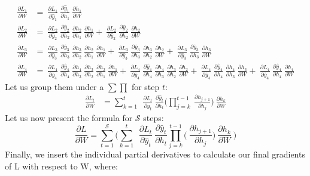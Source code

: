 \documentclass{article}
\begin{document}
\begin{align*}
\frac{\partial L_1}{ \partial{W}} & = ~\frac{\partial L_1}{ \partial \hat{y}_1}~\frac{\partial \hat{y}_1}{ \partial h_1}
  ~\frac{\partial h_1}{ \partial W} \\
	\frac{\partial L_2}{ \partial{W}} & = ~\frac{\partial L_2}{ \partial \hat{y}_2}~\frac{\partial \hat{y}_2}{ \partial h_2}
 ~\frac{\partial h_2}{ \partial h_1} ~\frac{\partial h_1}{ \partial W}	+ ~\frac{\partial L_2}{ \partial \hat{y}_2}~\frac{\partial \hat{y}_2}{ \partial h_2}
  ~\frac{\partial h_2}{ \partial W} \\
 \frac{\partial L_3}{ \partial{W}} & = ~\frac{\partial L_3}{ \partial \hat{y}_3}~\frac{\partial \hat{y}_3}{ \partial h_3}
 ~\frac{\partial h_3}{ \partial h_2} ~\frac{\partial h_2}{ \partial h_1} ~\frac{\partial h_1}{ \partial W}	+ ~\frac{\partial L_3}{ \partial \hat{y}_3}~\frac{\partial \hat{y}_3}{ \partial h_3}
 ~\frac{\partial h_3}{ \partial h_2} ~\frac{\partial h_2}{ \partial W} +  ~\frac{\partial L_3}{ \partial \hat{y}_3}~\frac{\partial \hat{y}_3}{ \partial h_3}
  ~\frac{\partial h_3}{ \partial W} \\
 \frac{\partial L_4}{ \partial{W}} & = ~\frac{\partial L_4}{ \partial \hat{y}_4}~\frac{\partial \hat{y}_4}{ \partial h_4}
 ~\frac{\partial h_4}{ \partial h_3}~\frac{\partial h_3}{ \partial h_2}~\frac{\partial h_2}{ \partial h_1} ~\frac{\partial h_1}{ \partial W}	+ ~\frac{\partial L_4}{ \partial \hat{y}_4}~\frac{\partial \hat{y}_4}{ \partial h_4}
 ~\frac{\partial h_4}{ \partial h_3} ~\frac{\partial h_3}{ \partial h_2} ~\frac{\partial h_2}{ \partial W} +  ~\frac{\partial L_4}{ \partial \hat{y}_4}~\frac{\partial \hat{y}_4}{ \partial h_4}
 ~\frac{\partial h_4}{ \partial h_3} ~\frac{\partial h_3}{ \partial W} + ~\frac{\partial L_4}{ \partial \hat{y}_4}~\frac{\partial \hat{y}_4}{ \partial h_4}
  ~\frac{\partial h_4}{ \partial W}
\end{align*}
Let us group them under a $\sum \prod$  for step $t$:
\begin{align*}
	\frac{\partial L_t}{ \partial{W}} & = \sum_{k=1}^{t} ~
	~\frac{\partial L_t}{\partial \hat{y}_t}
	~\frac{\partial \hat{y}_t}{\partial h_t}
    \bigg( \prod_{j=k}^{t-1} 
	~\frac{\partial h_{j+1}}{\partial h_{j}}
    \bigg)
	~\frac{\partial h_k}{\partial W}
\end{align*}
Let us now present the formula for $\mathcal{S}$ steps:
\begin{equation}
	\frac{\partial L}{ \partial{W}} = \sum_{t=1}^{\mathcal{S}} 
	\bigg(	
	 \sum_{k=1}^{t} ~
	~\frac{\partial L_t}{\partial \hat{y}_t}
	~\frac{\partial \hat{y}_t}{\partial h_t}
        \prod_{j=k}^{t-1} \bigg(
	~\frac{\partial h_{j+1}}{\partial h_{j}}
        \bigg)
	~\frac{\partial h_k}{\partial W}~
	\bigg) 
 \label{eqn:partial_L_W}
\end{equation}
Finally, we insert the individual partial derivatives to calculate our final gradients of L with respect to W, where:
\end{document}
